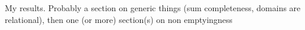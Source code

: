 
My results. Probably a section on generic things (sum completeness, domains are relational), then one (or more) section(s) on non emptyingness
